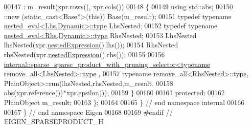 \begin{DoxyCode}
00147     : m\_result(xpr.rows(), xpr.cols())
00148   \{
00149     \textcolor{keyword}{using} std::abs;
00150     ::new (static\_cast<Base*>(\textcolor{keyword}{this})) Base(m\_result);
00151     \textcolor{keyword}{typedef} \textcolor{keyword}{typename} \hyperlink{class_eigen_1_1internal_1_1_tensor_lazy_evaluator_writable}{nested\_eval<Lhs,Dynamic>::type} LhsNested;
00152     \textcolor{keyword}{typedef} \textcolor{keyword}{typename} \hyperlink{class_eigen_1_1internal_1_1_tensor_lazy_evaluator_writable}{nested\_eval<Rhs,Dynamic>::type} RhsNested;
00153     LhsNested lhsNested(xpr.\hyperlink{group___sparse_core___module_a50f53a9405017012077ae907959aca14}{nestedExpression}().lhs());
00154     RhsNested rhsNested(xpr.\hyperlink{group___sparse_core___module_a50f53a9405017012077ae907959aca14}{nestedExpression}().rhs());
00155 
00156     
      \hyperlink{struct_eigen_1_1internal_1_1sparse__sparse__product__with__pruning__selector}{internal::sparse\_sparse\_product\_with\_pruning\_selector<typename remove\_all<LhsNested>::type}
      ,
00157                                                           \textcolor{keyword}{typename} 
      \hyperlink{group___sparse_core___module}{remove\_all<RhsNested>::type}, PlainObject>::run(lhsNested,rhsNested,m\_result,
00158                                                                                                            
             abs(xpr.reference())*xpr.epsilon());
00159   \}
00160 
00161 \textcolor{keyword}{protected}:
00162   PlainObject m\_result;
00163 \};
00164 
00165 \} \textcolor{comment}{// end namespace internal}
00166 
00167 \} \textcolor{comment}{// end namespace Eigen}
00168 
00169 \textcolor{preprocessor}{#endif // EIGEN\_SPARSEPRODUCT\_H}
\end{DoxyCode}
